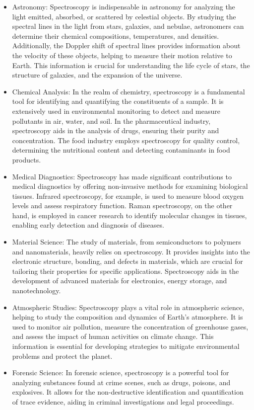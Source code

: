 \documentclass[12pt]{article}
\begin{document}
	\begin{itemize}
		\item Astronomy: Spectroscopy is indispensable in astronomy for analyzing the light emitted, absorbed, or scattered by celestial objects. By studying the spectral lines in the light from stars, galaxies, and nebulae, astronomers can determine their chemical compositions, temperatures, and densities. Additionally, the Doppler shift of spectral lines provides information about the velocity of these objects, helping to measure their motion relative to Earth. This information is crucial for understanding the life cycle of stars, the structure of galaxies, and the expansion of the universe.
		\item Chemical Analysis: In the realm of chemistry, spectroscopy is a fundamental tool for identifying and quantifying the constituents of a sample. It is extensively used in environmental monitoring to detect and measure pollutants in air, water, and soil. In the pharmaceutical industry, spectroscopy aids in the analysis of drugs, ensuring their purity and concentration. The food industry employs spectroscopy for quality control, determining the nutritional content and detecting contaminants in food products.
		\item Medical Diagnostics: Spectroscopy has made significant contributions to medical diagnostics by offering non-invasive methods for examining biological tissues. Infrared spectroscopy, for example, is used to measure blood oxygen levels and assess respiratory function. Raman spectroscopy, on the other hand, is employed in cancer research to identify molecular changes in tissues, enabling early detection and diagnosis of diseases.
		\item Material Science: The study of materials, from semiconductors to polymers and nanomaterials, heavily relies on spectroscopy. It provides insights into the electronic structure, bonding, and defects in materials, which are crucial for tailoring their properties for specific applications. Spectroscopy aids in the development of advanced materials for electronics, energy storage, and nanotechnology.
		\item Atmospheric Studies: Spectroscopy plays a vital role in atmospheric science, helping to study the composition and dynamics of Earth's atmosphere. It is used to monitor air pollution, measure the concentration of greenhouse gases, and assess the impact of human activities on climate change. This information is essential for developing strategies to mitigate environmental problems and protect the planet.
		\item Forensic Science: In forensic science, spectroscopy is a powerful tool for analyzing substances found at crime scenes, such as drugs, poisons, and explosives. It allows for the non-destructive identification and quantification of trace evidence, aiding in criminal investigations and legal proceedings.
	\end{itemize}
\end{document}
